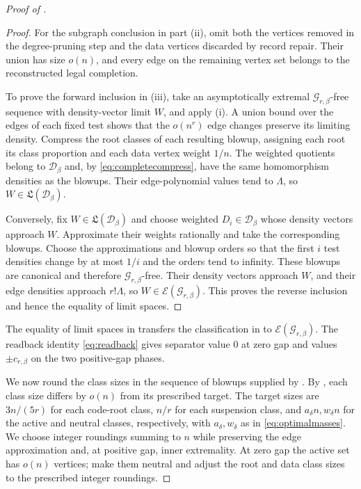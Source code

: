 \documentclass[10pt]{article}
\numberwithin{equation}{section}
\theoremstyle{definition}
\newcommand{\cD}{\mathcal D}\newcommand{\cE}{\mathcal E}\newcommand{\cF}{\mathcal F}
\newcommand{\cG}{\mathcal G}\newcommand{\cH}{\mathcal H}\newcommand{\cJ}{\mathcal J}
\begin{document}
\begin{proof}[Proof of ]
\begin{proof}
For the subgraph conclusion in part \textup{(ii)}, omit both the vertices removed in the degree-pruning step and the data vertices discarded by record repair. Their union has size $o(n)$, and every edge on the remaining vertex set belongs to the reconstructed legal completion.

To prove the forward inclusion in \textup{(iii)}, take an asymptotically extremal $\cG_{r,\beta}$-free sequence with density-vector limit $W$, and apply \textup{(i)}. A union bound over the edges of each fixed test shows that the $o(n^r)$ edge changes preserve its limiting density. Compress the root classes of each resulting blowup, assigning each root its class proportion and each data vertex weight $1/n$. The weighted quotients belong to $\cD_\beta$ and, by \eqref{eq:completecompress}, have the same homomorphism densities as the blowups. Their edge-polynomial values tend to $\Lambda$, so $W\in\mathfrak L(\cD_\beta)$.

Conversely, fix $W\in\mathfrak L(\cD_\beta)$ and choose weighted $D_i\in\cD_\beta$ whose density vectors approach $W$. Approximate their weights rationally and take the corresponding blowups. Choose the approximations and blowup orders so that the first $i$ test densities change by at most $1/i$ and the orders tend to infinity. These blowups are canonical and therefore $\cG_{r,\beta}$-free. Their density vectors approach $W$, and their edge densities approach $r!\Lambda$, so $W\in\cE(\cG_{r,\beta})$. This proves the reverse inclusion and hence the equality of limit spaces.
\end{proof}

The equality of limit spaces in  transfers the classification in  to $\cE(\cG_{r,\beta})$. The readback identity \eqref{eq:readback} gives separator value $0$ at zero gap and values $\pm c_{r,\beta}$ on the two positive-gap phases.

We now round the class sizes in the sequence of blowups supplied by . By , each class size differs by $o(n)$ from its prescribed target. The target sizes are $3n/(5r)$ for each code-root class, $n/r$ for each suspension class, and $a_\delta n,w_\delta n$ for the active and neutral classes, respectively, with $a_\delta,w_\delta$ as in \eqref{eq:optimalmasses}. We choose integer roundings summing to $n$ while preserving the edge approximation and, at positive gap, inner extremality. At zero gap the active set has $o(n)$ vertices; make them neutral and adjust the root and data class sizes to the prescribed integer roundings.


\end{proof}
\end{document}
